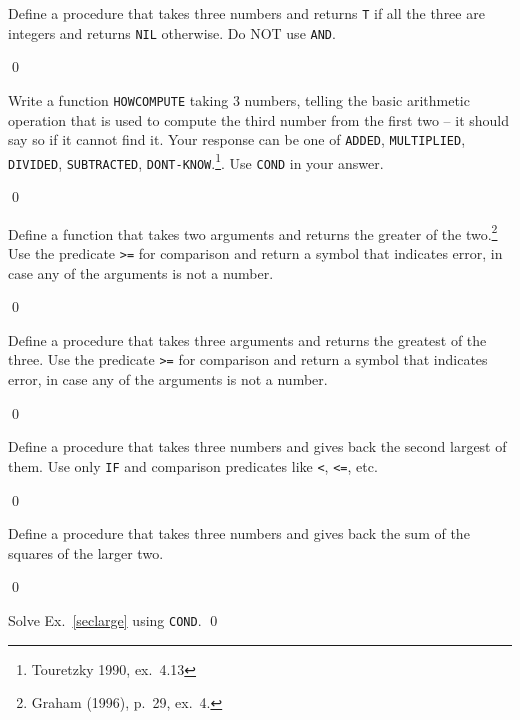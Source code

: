 \documentclass[a4paper,11pt]{article}
\begin{document}
\begin{uexercise}
Define a procedure that takes three numbers and returns \Verb+T+ if all the three are integers and returns \Verb+NIL+ otherwise. Do NOT use \Verb+AND+. 

\qed
\end{uexercise}


\begin{uexercise}
Write a function \Verb+HOWCOMPUTE+ taking 3 numbers, telling the basic arithmetic operation that is used to compute the third number from the first two -- it should say so if it cannot find it. Your response can be one of \Verb+ADDED+, \Verb+MULTIPLIED+, \Verb+DIVIDED+, \Verb+SUBTRACTED+, \Verb+DONT-KNOW+.\footnote{Touretzky 1990, ex.\ 4.13}. Use \Verb+COND+ in your answer.

\qed
\end{uexercise}

\begin{uexercise}
Define a function that takes two arguments and returns the greater of the two.\footnote{Graham (1996), p.\ 29, ex.\ 4.} Use the predicate \Verb+>=+ for comparison and return a symbol that indicates error, in case any of the arguments is not a number.

\qed
\end{uexercise}

\begin{uexercise}
Define a procedure that takes three arguments and returns the greatest of the three.  Use the predicate \Verb+>=+ for comparison and return a symbol that indicates error, in case any of the arguments is not a number.

\qed
\end{uexercise}

\begin{uexercise}
\label{seclarge}
Define a procedure that takes three numbers and gives back the second largest of them. Use only \Verb+IF+ and comparison predicates like \Verb+<+, \Verb+<=+, etc.

\qed
\end{uexercise}

\begin{uexercise}

Define a procedure that takes three numbers and gives back the sum of the squares of the larger two. 

\qed
\end{uexercise}

\begin{uexercise}
Solve Ex.\ \ref{seclarge} using \Verb+COND+.
\qed
\end{uexercise}
\end{document}
